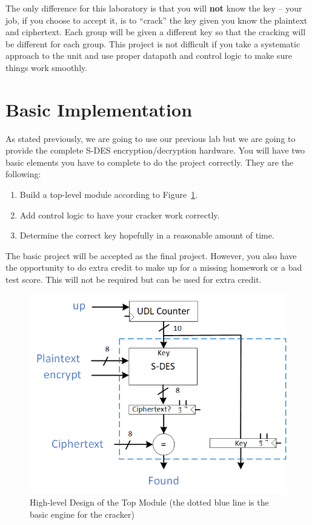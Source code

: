 \documentclass{article}
\begin{document}
The only difference
for this laboratory is that you will \textbf{not} know the key -- your job, if
you choose to accept it, is to ``crack'' the key given you know the
plaintext and ciphertext.  Each group will be given a different key so
that the cracking will be different for each group.  This project is
not difficult if you take a systematic approach to the unit and use
proper datapath and control logic to make sure things work smoothly.   

\section{Basic Implementation}

As stated previously, we are going to use our previous lab but we are
going to provide the complete S-DES encryption/decryption hardware.
You will have two basic
elements you have to complete to do the project correctly.  They are
the following:
\begin{enumerate}
\item Build a top-level module according to Figure~\ref{block2.fig}.
\item Add control logic to have your cracker work correctly.
\item Determine the correct key hopefully in a reasonable amount of time.
\end{enumerate}
The basic project will be accepted as the final project.  However, you
also have the opportunity to do extra credit to make up for a missing
homework or a bad test score.
This will not be required but can be used for extra credit.
\begin{figure} [t!]
  \centering
  \includegraphics[scale=1.3]{crack.png}
  \caption{High-level Design of the Top Module (the dotted blue line is the basic
  engine for the cracker)}
  \label{block2.fig}
\end{figure}
\end{document}
